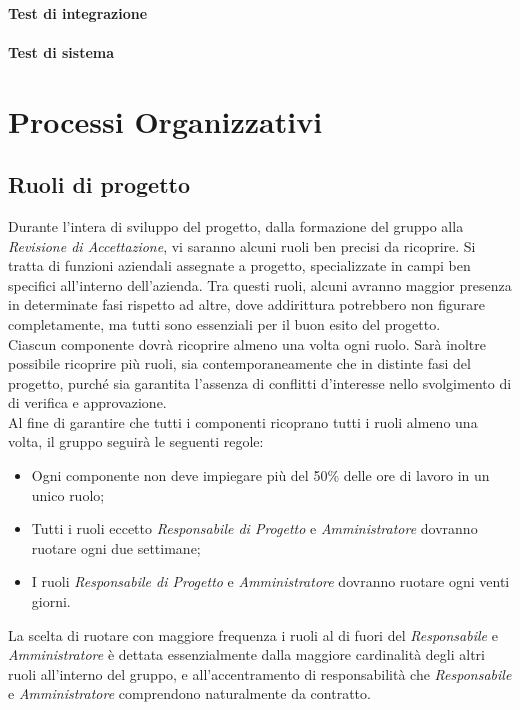 \documentclass{scalatekids-article}
\begin{document}
\paragraph{Test di integrazione}

\paragraph{Test di sistema}


\section{Processi Organizzativi}


\subsection{Ruoli di progetto}

Durante l'intera  di sviluppo del progetto, dalla formazione del gruppo alla
\textit{Revisione di Accettazione}, vi saranno alcuni ruoli ben precisi da ricoprire. Si
tratta di funzioni aziendali assegnate a progetto, specializzate in campi ben
specifici all'interno dell'azienda. Tra questi ruoli, alcuni avranno maggior
presenza in determinate fasi rispetto ad altre, dove addirittura
potrebbero non figurare completamente, ma tutti sono essenziali per il buon
esito del progetto.\\ Ciascun componente dovrà ricoprire almeno una volta ogni
ruolo. Sarà inoltre possibile ricoprire più ruoli, sia contemporaneamente che in
distinte fasi del progetto, purché sia garantita l'assenza di conflitti
d'interesse nello svolgimento di  di verifica e approvazione.\\
Al fine di garantire che tutti i componenti ricoprano tutti i ruoli almeno una volta, il gruppo seguirà le seguenti regole:
\begin{itemize}
    \item Ogni componente non deve impiegare più del 50\% delle ore di lavoro in un unico ruolo;
    \item Tutti i ruoli eccetto \textit{Responsabile di Progetto} e \textit{Amministratore} dovranno ruotare ogni due settimane;
    \item I ruoli \textit{Responsabile di Progetto} e \textit{Amministratore} dovranno ruotare ogni venti giorni.
\end{itemize}
La scelta di ruotare con maggiore frequenza i ruoli al di fuori del
\textit{Responsabile} e \textit{Amministratore} è dettata essenzialmente dalla
maggiore cardinalità degli altri ruoli all'interno del gruppo, e
all'accentramento di responsabilità che \textit{Responsabile} e
\textit{Amministratore} comprendono naturalmente da contratto.
\end{document}
